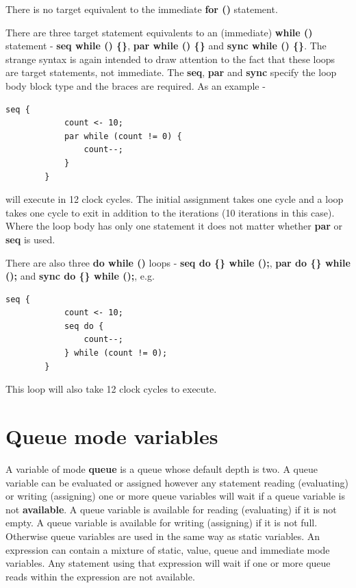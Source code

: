 \documentclass[10pt,a4paper,twoside,fleqn]{article}
\newcommand{\kwd}[1]{{\bf #1}} %
\newcommand{\var}[1]{{\bf #1}} %
\begin{document}
    There is no target equivalent to the immediate {\bf for ()} statement.
    
    There are three target statement equivalents to an (immediate) {\bf while ()}
    statement - {\bf seq while () \{\}}, {\bf par while () \{\}} and
    {\bf sync while () \{\}}. The strange syntax is again intended to draw
    attention to the fact that these loops are target statements, not immediate.
    The {\bf seq}, {\bf par} and {\bf sync} specify the loop body block type and
    the braces are required. As an example -
    \begin{lstlisting}[language=threepl]
        seq {
            count <- 10;
            par while (count != 0) {
                count--;
            }
        }
    \end{lstlisting}
    will execute in 12 clock cycles. The initial assignment takes one cycle
    and a loop takes one cycle to exit in addition to the iterations (10
    iterations in this case). Where the loop body has only one statement
    it does not matter whether {\bf par} or {\bf seq} is used.
    
    There are also three {\bf do while ()} loops -
    {\bf seq do \{\} while ();}, {\bf par do \{\} while ();} and
    {\bf sync do \{\} while ();}, e.g.
    \begin{lstlisting}[language=threepl]
        seq {
            count <- 10;
            seq do {
                count--;
            } while (count != 0);
        }
    \end{lstlisting}
    This loop will also take 12 clock cycles to execute.




\section{Queue mode variables}

    A variable of mode \kwd{queue} is a queue whose default depth is two. A
    queue variable can be evaluated or assigned however any statement reading
    (evaluating) or writing (assigning) one or more queue variables will wait if
    a queue variable is not \var{available}. A queue variable is available for
    reading (evaluating) if it is not empty. A queue variable is available for
    writing (assigning) if it is not full. Otherwise queue variables are used in
    the same way as static variables. An expression can contain a mixture of
    static, value, queue and immediate mode variables. Any statement using that
    expression will wait if one or more queue reads within the expression are
    not available.
    
\end{document}
